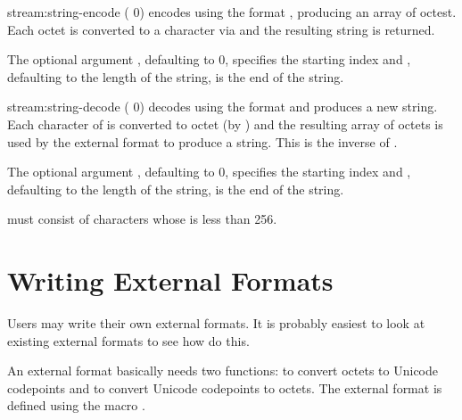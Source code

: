 \begin{defun}{stream:}{string-encode}{\args {}
     \ampoptional{} ( 0) }
   encodes  using the format
  , producing an array of octest.  Each octet is
  converted to a character via  and the resulting
  string is returned.

  The optional argument , defaulting to 0, specifies the
  starting index and , defaulting to the length of the
  string, is the end of the string.
\end{defun}

\begin{defun}{stream:}{string-decode}{\args {}
     \ampoptional{} ( 0) }
   decodes  using the format
   and produces a new string.  Each character of
   is converted to octet (by ) and the
  resulting array of octets is used by the external format to produce
  a string.  This is the inverse of .

  The optional argument , defaulting to 0, specifies the
  starting index and , defaulting to the length of the
  string, is the end of the string.

   must consist of characters whose  is
  less than 256.
\end{defun}

\section{Writing External Formats}

Users may write their own external formats.  It is probably easiest to
look at existing external formats to see how do this.

An external format basically needs two functions:
 to convert octets to Unicode codepoints and
 to convert Unicode codepoints to octets.  The
external format is defined using the macro
.


